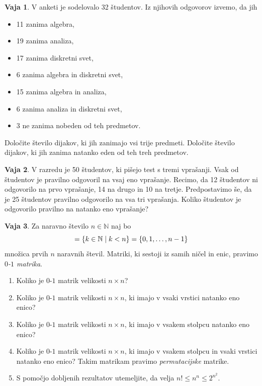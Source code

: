 \documentclass{article}
\newcommand{\NN}{\mathbb{N}}
\theoremstyle{definition}
\newtheorem{vaja}{Vaja}
\begin{document}
\begin{vaja}
  V anketi je sodelovalo 32 študentov. Iz njihovih odgovorov izvemo, da jih
  \begin{itemize}
    \item 11 zanima algebra,
    \item 19 zanima analiza,
    \item 17 zanima diskretni svet,
    \item 6 zanima algebra in diskretni svet,
    \item 15 zanima algebra in analiza,
    \item 6 zanima analiza in diskretni svet,
    \item 3 ne zanima nobeden od teh predmetov.
  \end{itemize}
  Določite število dijakov, ki jih zanimajo vsi trije predmeti. Določite število dijakov, ki jih zanima natanko eden od teh treh predmetov.
\end{vaja}

\begin{vaja}
  V razredu je 50 študentov, ki pišejo test s tremi vprašanji. Vsak od študentov je pravilno odgovoril na vsaj eno vprašanje. Recimo, da 12 študentov ni odgovorilo na prvo vprašanje, 14 na drugo in 10 na tretje. Predpostavimo še, da je 25 študentov pravilno odgovorilo na vsa tri vprašanja. Koliko študentov je odgovorilo pravilno na natanko eno vprašanje? 
\end{vaja}

\begin{vaja}
  Za naravno število $n \in \NN$ naj bo
  \begin{equation*}
    [n] = \set{k \in \NN}{k < n} = \set{0, 1, \ldots, n-1}
  \end{equation*}
  množica prvih $n$ naravnih števil.
  Matriki, ki sestoji iz samih ničel in enic, pravimo \emph{$0$-$1$ matrika}.
  \begin{enumerate}
    \item
      Koliko je $0$-$1$ matrik velikosti $n \times n$?
    \item
      Koliko je $0$-$1$ matrik velikosti $n \times n$, ki imajo v vsaki vrstici natanko eno enico?
    \item
      Koliko je $0$-$1$ matrik velikosti $n \times n$, ki imajo v vsakem stolpcu natanko eno enico?
    \item
      Koliko je $0$-$1$ matrik velikosti $n \times n$, ki imajo v vsakem stolpcu in vsaki vrstici natanko eno enico? Takim matrikam pravimo \emph{permutacijske} matrike.
    \item
      S pomočjo dobljenih rezultatov utemeljite, da velja $n! \leq n^n \leq 2^{n^2}$.
  \end{enumerate}
\end{vaja}
\end{document}

